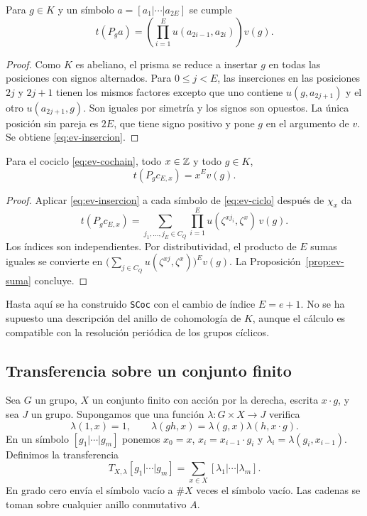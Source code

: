 \begin{lema}
\label{lem:ev-insercion}
Para $g\in K$ y un símbolo $a=[a_1|\cdots|a_{2E}]$ se cumple
\begin{equation}
 t(P_ga)=\left(\prod_{i=1}^E u(a_{2i-1},a_{2i})\right)v(g).
 \label{eq:ev-insercion}
\end{equation}
\end{lema}
\begin{proof}
Como $K$ es abeliano, el prisma se reduce a insertar $g$ en todas las posiciones con signos alternados. Para $0\le j<E$, las inserciones en las posiciones $2j$ y $2j+1$ tienen los mismos factores excepto que uno contiene $u(g,a_{2j+1})$ y el otro $u(a_{2j+1},g)$. Son iguales por simetría y los signos son opuestos. La única posición sin pareja es $2E$, que tiene signo positivo y pone $g$ en el argumento de $v$. Se obtiene \eqref{eq:ev-insercion}.
\end{proof}

\begin{teorema}
\label{thm:ev-escalar}
Para el cociclo \eqref{eq:ev-cochain}, todo $x\in\mathbb{Z}$ y todo $g\in K$,
\begin{equation}
 t(P_g c_{E,x})=x^Ev(g).
 \label{eq:ev-escalar-valor}
\end{equation}
\end{teorema}
\begin{proof}
Aplicar \eqref{eq:ev-insercion} a cada símbolo de \eqref{eq:ev-ciclo} después de $\chi_x$ da
\[
 t(P_g c_{E,x})
 =\sum_{j_1,\ldots,j_E\in C_Q}
     \prod_{i=1}^E u(\zeta^{xj_i},\zeta^x)\,v(g).
\]
Los índices son independientes. Por distributividad, el producto de $E$ sumas iguales se convierte en $\bigl(\sum_{j\in C_Q}u(\zeta^{xj},\zeta^x)\bigr)^Ev(g)$. La Proposición~\ref{prop:ev-suma} concluye.
\end{proof}

Hasta aquí se ha construido \texttt{SCoc} con el cambio de índice $E=e+1$. No se ha supuesto una descripción del anillo de cohomología de $K$, aunque el cálculo es compatible con la resolución periódica de los grupos cíclicos.

\subsection{Transferencia sobre un conjunto finito}

Sea $G$ un grupo, $X$ un conjunto finito con acción por la derecha, escrita $x\cdot g$, y sea $J$ un grupo. Supongamos que una función $\lambda:G\times X\to J$ verifica
\begin{equation}
 \lambda(1,x)=1,\qquad
 \lambda(gh,x)=\lambda(g,x)\lambda(h,x\cdot g).
 \label{eq:ev-accion}
\end{equation}
En un símbolo $[g_1|\cdots|g_m]$ ponemos $x_0=x$, $x_i=x_{i-1}\cdot g_i$ y $\lambda_i=\lambda(g_i,x_{i-1})$. Definimos la transferencia
\begin{equation}
 T_{X,\lambda}[g_1|\cdots|g_m]
 =\sum_{x\in X}[\lambda_1|\cdots|\lambda_m].
 \label{eq:ev-transferencia}
\end{equation}
En grado cero envía el símbolo vacío a $\#X$ veces el símbolo vacío. Las cadenas se toman sobre cualquier anillo conmutativo $A$.

